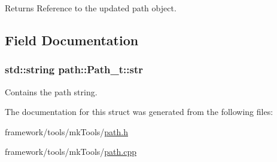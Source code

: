 \begin{DoxyReturn}{Returns}
Reference to the updated path object. 
\end{DoxyReturn}


\subsection{Field Documentation}
\subsubsection[{\texorpdfstring{str}{str}}]{\setlength{\rightskip}{0pt plus 5cm}std\+::string path\+::\+Path\+\_\+t\+::str}\hypertarget{structpath_1_1_path__t_a528e70fef141e4e211ddb07ea86e8e62}{}\label{structpath_1_1_path__t_a528e70fef141e4e211ddb07ea86e8e62}


Contains the path string. 



The documentation for this struct was generated from the following files\+:\begin{DoxyCompactItemize}
\item 
framework/tools/mk\+Tools/\hyperlink{path_8h}{path.\+h}\item 
framework/tools/mk\+Tools/\hyperlink{path_8cpp}{path.\+cpp}\end{DoxyCompactItemize}
